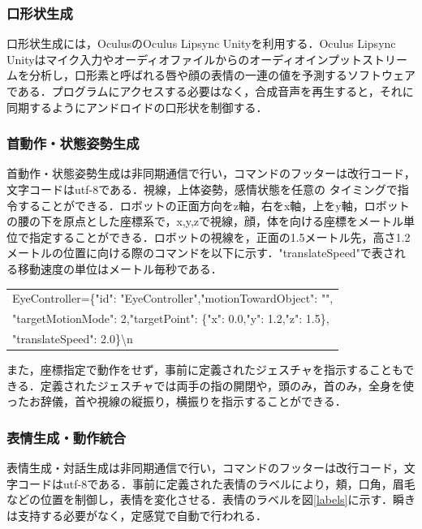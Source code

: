 \subsubsection{口形状生成}
口形状生成には，OculusのOculus Lipsync Unityを利用する．Oculus Lipsync Unityはマイク入力やオーディオファイルからのオーディオインプットストリームを分析し，口形素と呼ばれる唇や顔の表情の一連の値を予測するソフトウェアである．プログラムにアクセスする必要はなく，合成音声を再生すると，それに同期するようにアンドロイドの口形状を制御する．

\subsubsection{首動作・状態姿勢生成}
首動作・状態姿勢生成は非同期通信で行い，コマンドのフッターは改行コード，文字コードはutf-8である．視線，上体姿勢，感情状態を任意の タイミングで指令することができる．ロボットの正面方向をz軸，右をx軸，上をy軸，ロボットの腰の下を原点とした座標系で，x,y,zで視線，顔，体を向ける座標をメートル単位で指定することができる．ロボットの視線を，正面の1.5メートル先，高さ1.2メートルの位置に向ける際のコマンドを以下に示す．"translateSpeed"で表される移動速度の単位はメートル毎秒である．
\begin{table}[hbtp]
    \centering
    \begin{tabular}{l}
        EyeController=\{"id": "EyeController","motionTowardObject": "",\\
        "targetMotionMode": 2,"targetPoint": \{"x": 0.0,"y": 1.2,"z": 1.5\},\\
        "translateSpeed": 2.0\}\textbackslash{}n
    \end{tabular}
\end{table}
また，座標指定で動作をせず，事前に定義されたジェスチャを指示することもできる．定義されたジェスチャでは両手の指の開閉や，頭のみ，首のみ，全身を使ったお辞儀，首や視線の縦振り，横振りを指示することができる．

\subsubsection{表情生成・動作統合}
表情生成・対話生成は非同期通信で行い，コマンドのフッターは改行コード，文字コードはutf-8である．事前に定義された表情のラベルにより，頬，口角，眉毛などの位置を制御し，表情を変化させる．表情のラベルを図\ref{labels}に示す．瞬きは支持する必要がなく，定感覚で自動で行われる．

